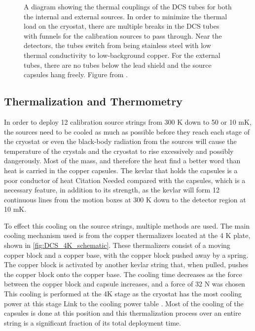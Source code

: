\begin{figure}[htbp]
    \caption[A diagram showing the thermal couplings of the DCS tubes for both the internal and external sources.]
    {A diagram showing the thermal couplings of the DCS tubes for both the internal and external sources.
    In order to minimize the thermal load on the cryostat, there are multiple breaks in the DCS tubes with funnels for the calibration sources to pass through.
    Near the detectors, the tubes switch from being stainless steel with low thermal conductivity to low-background copper.
    For the external tubes, there are no tubes below the lead shield and the source capsules hang freely.
    Figure from \cite{Cushman:2016cnv}.}
    \label{fig:dcs_thermal_coupling}
\end{figure}


\subsection{Thermalization and Thermometry}
In order to deploy 12 calibration source strings from 300 K down to 50 or 10 mK, the sources need to be cooled as much as possible before they reach each stage of the cryostat or even the black-body radiation from the sources will cause the temperature of the crystals and the cryostat to rise excessively and possibly dangerously. Most of the mass, and therefore the heat \color{red} find a better word than heat \color{black} is carried in the copper capsules. The kevlar that holds the capsules is a poor conductor of heat \color{red} Citation Needed \color{black} compared with the capsules, which is a necessary feature, in addition to its strength, as the kevlar will form 12 continuous lines from the motion boxes at 300 K down to the detector region at 10 mK.

To effect this cooling on the source strings, multiple methods are used. The main cooling mechanism used is from the copper thermalizers located at the 4 K plate, shown in \autoref{fig:DCS_4K_schematic}. These thermalizers consist of a moving copper block and a copper base, with the copper block pushed away by a spring. The copper block is activated by another kevlar string that, when pulled, pushes the copper block onto the copper base. The cooling time decreases as the force between the copper block and capsule increases, and a force of 32 N was chosen This cooling is performed at the 4K stage as the cryostat has the most cooling power at this stage \color{red} Link to the cooling power table \color{black}. Most of the cooling of the capsules is done at this position and this thermalization process over an entire string is a significant fraction of its total deployment time.


